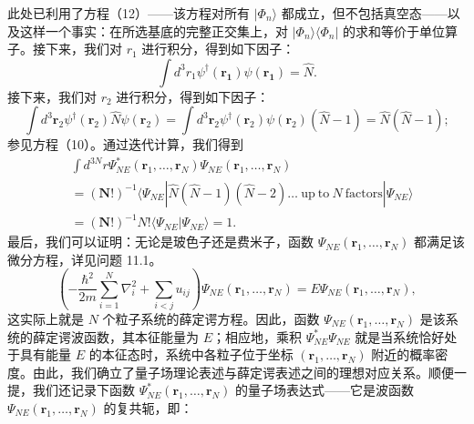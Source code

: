 此处已利用了方程（12）——该方程对所有 \(|\Phi_{n}\rangle\) 都成立，但不包括真空态——以及这样一个事实：在所选基底的完整正交集上，对 \(|\Phi_{n}\rangle\langle\Phi_{n}|\) 的求和等价于单位算子。接下来，我们对 \(r_{1}\) 进行积分，得到如下因子：
\begin{equation}\tag{11.1.19}\label{eq:11.1.19}
\int d ^{3} r _ { 1 } \psi ^{\dagger} ( \pmb { r _ { 1 } } ) \psi ( \pmb { r _ { 1 } } ) = \hat { N } .
\end{equation}
接下来，我们对 \(r_{2}\) 进行积分，得到如下因子：
\begin{equation}\tag{11.1.20}\label{eq:11.1.20}
\int d ^{3} \pmb { r } _ { 2 } \psi ^{\dagger} ( \pmb { r } _ { 2 } ) \hat { N } \psi ( \pmb { r } _ { 2 } ) = \int d ^{3} \pmb { r } _ { 2 } \psi ^{\dagger} ( \pmb { r } _ { 2 } ) \psi ( \pmb { r } _ { 2 } ) ( \hat { N } - 1 ) = \hat { N } ( \hat { N } - 1 ) ;
\end{equation}
参见方程（10）。通过迭代计算，我们得到
\begin{equation}\tag{11.1.21}\label{eq:11.1.21}
\begin{array}{rl} & { \int d ^{3 N} r \Psi _ { N E } ^{*} ( \pmb { r } _ { 1 } , \dots , \pmb { r } _ { N } ) \Psi _ { N E } ( \pmb { r } _ { 1 } , \dots , \pmb { r } _ { N } ) } \\& {  = ( \pmb { N } ! ) ^{- 1} \langle \Psi _ { N E } | \hat { N } ( \hat { N } - 1 ) ( \hat { N } - 2 ) \dots \mathrm { ~ u p ~ t o ~ } N \mathrm { ~ f a c t o r s } | \Psi _ { N E } \rangle } \\& {  = ( \pmb { N } ! ) ^{- 1} N ! \langle \Psi _ { N E } | \Psi _ { N E } \rangle = 1 . } \end{array}
\end{equation}
最后，我们可以证明：无论是玻色子还是费米子，函数 \(\Psi_{NE}(\boldsymbol{r}_1,\ldots,\boldsymbol{r}_N)\) 都满足该微分方程，详见问题 11.1。
\begin{equation}\tag{11.1.22}\label{eq:11.1.22}
\left( - \frac { \hbar ^{2} } { 2 m } \sum _ { i = 1 } ^{N} \nabla _ { i } ^{2} + \sum _ { i < j } u _ { i j } \right) \Psi _ { N E } ( \pmb { r } _ { 1 } , \ldots , \pmb { r } _ { N } ) = E \Psi _ { N E } ( \pmb { r } _ { 1 } , \ldots , \pmb { r } _ { N } ) ,
\end{equation}
这实际上就是 \(N\) 个粒子系统的薛定谔方程。因此，函数 \(\Psi_{NE}(\boldsymbol{r}_{1},\ldots,\boldsymbol{r}_{N})\) 是该系统的薛定谔波函数，其本征能量为 \(E\)；相应地，乘积 \(\Psi_{NE}^{*}\Psi_{NE}\) 就是当系统恰好处于具有能量 \(E\) 的本征态时，系统中各粒子位于坐标 \((\boldsymbol{r}_{1},\ldots,\boldsymbol{r}_{N})\) 附近的概率密度。由此，我们确立了量子场理论表述与薛定谔表述之间的理想对应关系。顺便一提，我们还记录下函数 \(\Psi_{NE}^{*}(\boldsymbol{r}_{1},\ldots,\boldsymbol{r}_{N})\) 的量子场表达式——它是波函数 \(\Psi_{NE}(\boldsymbol{r}_{1},\ldots,\boldsymbol{r}_{N})\) 的复共轭，即：

